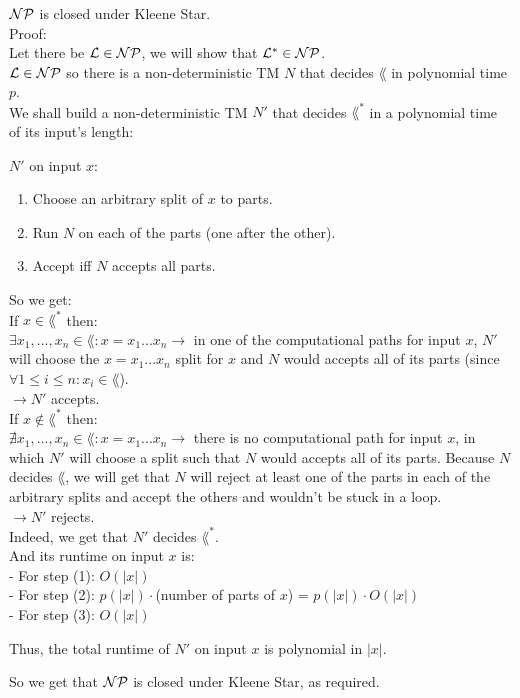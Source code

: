 $\mathcal{N}\mathcal{P}$ is closed under Kleene Star. \\

Proof: \\
Let there be $\mathcal{L} \in \mathcal{N}\mathcal{P}$, we will show that $\mathcal{L}^* \in \mathcal{N}\mathcal{P}$. \\
$\mathcal{L} \in \mathcal{N}\mathcal{P}$ so there is a non-deterministic TM $N$ that decides $\lang$ in polynomial time $p$. \\
We shall build a non-deterministic TM $N'$ that decides $\lang^*$ in a polynomial time of its input's length:

$N'$ on input $x$:
\begin{enumerate}[1., itemsep=5pt]

    \item Choose an arbitrary split of $x$ to parts.

    \item Run $N$ on each of the parts (one after the other).

    \item Accept iff $N$ accepts all parts.

\end{enumerate}

So we get: \\
If $x \in \lang^*$ then: \\
$\exists x_1,...,x_n \in \lang: x=x_1...x_n \rightarrow $ in one of the computational
paths for input $x$, $N'$ will choose the $x=x_1...x_n$ split for $x$ and $N$ would accepts all of its parts
(since $\forall 1 \leq i \leq n: x_i \in \lang$). \\
$\rightarrow N'$ accepts. \\

If $x \notin \lang^*$ then: \\
$\nexists x_1,...,x_n \in \lang: x=x_1...x_n \rightarrow $ there is no computational
path for input $x$, in which $N'$ will choose a split such that $N$ would accepts all of its parts.
Because $N$ decides $\lang$, we will get that $N$ will reject at least one of the parts in
each of the arbitrary splits and accept the others and wouldn't be stuck in a loop. \\
$\rightarrow N'$ rejects. \\

Indeed, we get that $N'$ decides $\lang^*$. \\
And its runtime on input $x$ is: \\
- For step (1): $O(|x|)$ \\
- For step (2): $p(|x|) \cdot$(number of parts of $x$) = $p(|x|) \cdot O(|x|)$ \\
- For step (3): $O(|x|)$

Thus, the total runtime of $N'$ on input $x$ is polynomial in $|x|$.

So we get that $\mathcal{N}\mathcal{P}$ is closed under Kleene Star, as required. \\

